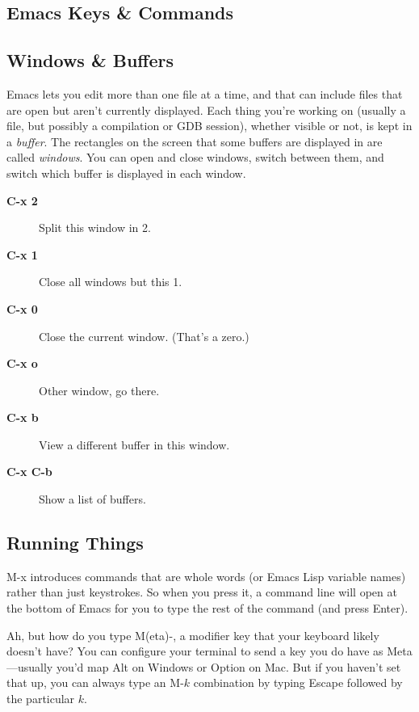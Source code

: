 \documentclass[11pt]{article}
\newenvironment{commands}
{\bgroup
  \let\olditem\item
  \def\item[##1]{\olditem[{\sffamily\upshape\bfseries##1}]}%
  \begin{description}}
  {\end{description}\egroup}
\begin{document}
\begin{multicols}{2}
\section*{Emacs Keys \& Commands}

\subsection*{Windows \& Buffers}

Emacs lets you edit more than one file at a time, and that can include
  files that are open but aren’t currently displayed. Each thing you’re
  working on (usually a file, but possibly a compilation or GDB
  session), whether visible or not, is kept in a \emph{buffer}. The
  rectangles on the screen that some buffers are displayed in are called
  \emph{windows}. You can open and close windows, switch between them,
  and switch which buffer is displayed in each window.

\begin{commands}
\item[C-x 2] Split this window in 2.
\item[C-x 1] Close all windows but this 1.
\item[C-x 0] Close the current window. (That's a zero.)
\item[C-x o] Other window, go there.
\item[C-x b] View a different buffer in this window.
\item[C-x C-b] Show a list of buffers.
\end{commands}

\subsection*{Running Things}

\textsf{M-x} introduces commands that are whole words (or Emacs Lisp
  variable names) rather than just keystrokes. So when you press it, a
  command line will open at the bottom of Emacs for you to type the rest
  of the command (and press Enter).

  Ah, but how do you type \textsf{M(eta)-}, a modifier key that your
  keyboard likely doesn’t have? You can configure your terminal to send
  a key you do have as \textsf{Meta}—usually you’d map \textsf{Alt} on
  Windows or \textsf{Option} on Mac. But if you haven’t set that up, you
  can always type an \textsf{M-}$k$ combination by typing
  \textsf{Escape} followed by the particular $k$.

\begin{commands}


\end{commands}
\end{multicols}
\end{document}
